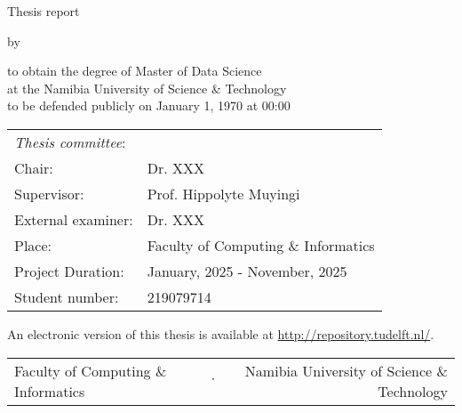 \begin{titlepage}

\begin{center}

{\makeatletter
\largetitlestyle\fontsize{45}{45}\selectfont\@title
\makeatother}

\bigskip

{\makeatletter
\vspace{12mm}
\ifdefvoid{\@subtitle}{}{\largetitlestyle\fontsize{20}{20}\selectfont\@subtitle}
\makeatother}

\bigskip
\bigskip

Thesis report

\bigskip
\bigskip

by

\bigskip
\bigskip

{\makeatletter
\largetitlestyle\fontsize{25}{25}\selectfont\@author
\makeatother}

\bigskip
\bigskip

to obtain the degree of Master of Data Science \\
at the Namibia University of Science \& Technology \\
to be defended publicly on January 1, 1970 at 00:00

\vfill

\begin{tabular}{ll}
\textit{Thesis committee}:      & \\
Chair:                          & Dr. XXX \\ 
Supervisor:                     & Prof. Hippolyte Muyingi \\
External examiner:              & Dr. XXX \\ 
Place:                          & Faculty of Computing \& Informatics \\
Project Duration: & January, 2025 - November, 2025 \\
Student number: & 219079714
\end{tabular}

\vspace*{1cm}

An electronic version of this thesis is available at \url{http://repository.tudelft.nl/}.

\vspace*{2cm}
  \begin{center}
    \begin{tabular}{lcr}
      Faculty of Computing \& Informatics & $\cdot$ & Namibia University of Science \& Technology
    \end{tabular}
  \end{center}

\end{center}

\end{titlepage}
